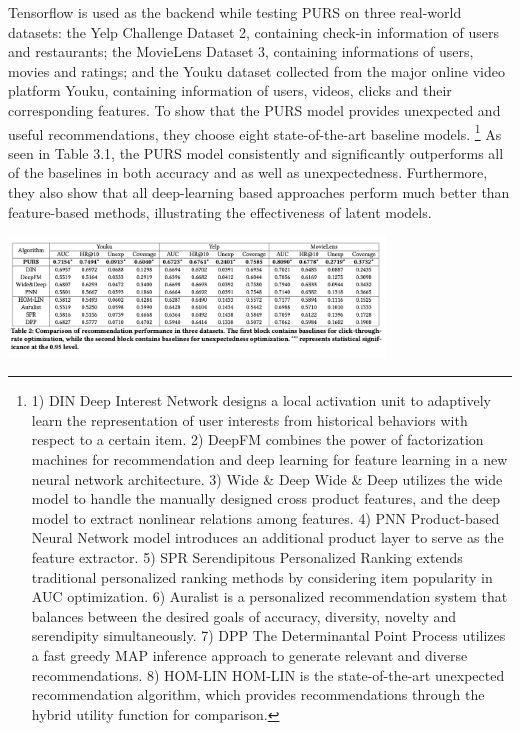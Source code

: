 Tensorflow is used as the backend while testing PURS on three real-world datasets: the Yelp Challenge Dataset 2, containing check-in information of users and restaurants; the MovieLens Dataset 3, containing informations of users, movies and ratings; and the Youku dataset collected from the major online video platform Youku, containing information of users, videos, clicks and their corresponding features. To show that the PURS model provides unexpected and useful recommendations, they choose eight state-of-the-art baseline models. \footnote { 1) DIN Deep Interest Network designs a local activation unit to adaptively learn the representation of user interests from historical behaviors with respect to a certain item. 2) DeepFM combines the power of factorization machines for recommendation and deep learning for feature learning in a new neural network architecture. 3) Wide \& Deep Wide \& Deep utilizes the wide model to handle the manually designed cross product features, and the deep model to extract nonlinear relations among features. 4) PNN Product-based Neural Network model introduces an additional product layer to serve as the feature extractor. 5) SPR Serendipitous Personalized Ranking extends traditional personalized ranking methods by considering item popularity in AUC optimization. 6) Auralist is a personalized recommendation system that balances between the desired goals of accuracy, diversity, novelty and serendipity simultaneously. 7) DPP The Determinantal Point Process utilizes a fast greedy MAP inference approach to generate relevant and diverse recommendations. 8) HOM-LIN HOM-LIN is the state-of-the-art unexpected recommendation algorithm, which provides recommendations through the hybrid utility function for comparison.} As seen in Table 3.1, the PURS model consistently and significantly outperforms all of the baselines in both accuracy and as well as unexpectedness. Furthermore, they also show that all deep-learning based approaches perform much better than feature-based methods, illustrating the effectiveness of latent models.
\begin{table}[ht!]
    \centering
    \includegraphics[width=100mm]{results.png}
    \caption{Results Comparison(from [1])
    \label{overflow}}
\end{table}
